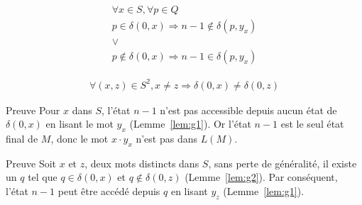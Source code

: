 \begin{frame}{\myframetitle}
  \begin{lemma}
    \vspace{-1.5\topsep}
    \begin{gather*}
      \forall x \in S, \forall p \in Q \\
      p \in \delta(0, x) \Longrightarrow n - 1 \notin \delta(p, y_x) \\
      \lor \\
      p \notin \delta(0, x) \Longrightarrow n - 1 \in \delta(p, y_x)
    \end{gather*}
  \end{lemma}

  \pause[]

  \begin{lemma}
    \vspace{-1.5\topsep}
    \begin{gather*}
      \forall (x, z) \in S^2, x \neq z \Longrightarrow \delta(0, x) \neq
      \delta(0, z)
    \end{gather*}
  \end{lemma}
\end{frame}

\begin{frame}{\myframetitle}
  \setcounter{enumi}{2}
  \begin{block}{
      Preuve
    }
    Pour \(x\) dans \(S\), l'état \(n - 1\) n'est pas accessible depuis aucun
    état de \(\delta(0, x)\) en lisant le mot \(y_x\) (Lemme~\ref{lem:g1}). Or
    l'état \(n - 1\) est le seul état final de \(M\), donc le mot \(x \cdot
    y_x\) n'est pas dans \(L(M)\).
  \end{block}

  \pause[]

  \setcounter{enumi}{3}
  \begin{block}{
      Preuve
    }
    Soit \(x\) et \(z\), deux mots distincts dans \(S\), sans perte de
    généralité, il existe un \(q\) tel que \(q \in \delta(0, x)\) et \(q \notin
    \delta(0, z)\) (Lemme~\ref{lem:g2}). Par conséquent, l'état \(n - 1\) peut
    être accédé depuis \(q\) en lisant \(y_z\) (Lemme~\ref{lem:g1}).
  \end{block}
\end{frame}

